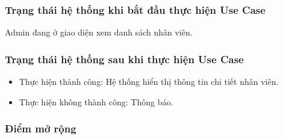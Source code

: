 \subsubsection{Trạng thái hệ thống khi bắt đầu thực hiện Use Case}
Admin đang ở giao diện xem danh sách nhân viên.

\subsubsection{Trạng thái hệ thống sau khi thực hiện Use Case}
\begin{itemize}
  \item Thực hiện thành công: Hệ thống hiển thị thông tin chi tiết nhân viên.
  \item Thực hiện không thành công: Thông báo.
\end{itemize}

\subsubsection{Điểm mở rộng}